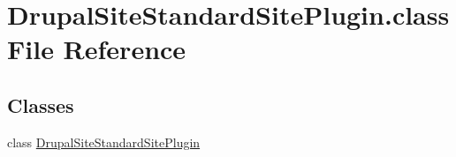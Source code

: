 \hypertarget{DrupalSiteStandardSitePlugin_8class}{\section{Drupal\-Site\-Standard\-Site\-Plugin.\-class File Reference}
\label{DrupalSiteStandardSitePlugin_8class}
}
\subsection*{Classes}
\begin{DoxyCompactItemize}
\item 
class \hyperlink{classDrupalSiteStandardSitePlugin}{Drupal\-Site\-Standard\-Site\-Plugin}
\end{DoxyCompactItemize}
